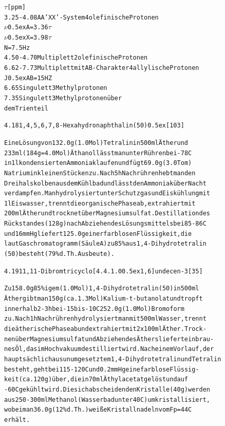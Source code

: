 \documentclass[a4paper,11pt]{article}
\begin{document}
\begin{alltt}

  \(\tau\)[ppm]
3.25 - 4.08  AA'XX'-System                4 olefinische Protonen
\(\nu\)\lower0.5ex\hbox{A} = 3.36\(\tau\)
\(\nu\)\lower0.5ex\hbox{X} = 3.98\(\tau\)
N = 7.5 Hz
4.50 - 4.70  Multiplett                   2 olefinische Protonen
6.62 - 7.73  Multiplett mit AB-Charakter  4 allylische Protonen
J\lower0.5ex\hbox{AB} = 15 HZ
6.65         Singulett                    3 Methylprotonen
7.35         Singulett                    3 Methylprotonen über
                                            dem Trienteil


\newpage
{}


4.18 1‚4,5,6‚7,8-Hexahydronaphthalin (50) \raise0.5ex\hbox{[103]}

Eine Lösung von 132.0 g (1.0 Mol) Tetralin in 500 ml Äther und
233 ml (184 g = 4.0 Mol) Äthanol lässt man unter Rühren bei -78\degree{}C
in 1 l kondensierten Ammoniak laufen und fügt 69.0 g (3.0 Tom)
Natrium in kleinen Stücken zu. Nach 5 h Nachrühren hebt man den
Dreihalskolben aus dem Kühlbad und lässt den Ammoniak über Nacht
verdampfen. Man hydrolysiert unter Schutzgas und Eiskühlung mit
1 l Eiswasser, trennt die organische Phase ab, extrahiert mit
200 ml Äther und trocknet über Magnesiumsulfat. Destillation des
Rückstandes (128 g) nach Abziehen des Lösungsmittels bei 85 - 86\degree{}C
und 16 mm Hg liefert 125.0 g einer farblosen Flüssigkeit, die
laut Gaschromatogramm (Säule A) zu 85 \% aus 1,4-Dihydrotetralin
(50) besteht (79 \% d.Th. Ausbeute).


4.19 11‚11-Dibromtricyclo[4.4.1.0\raise0.5ex\hbox{1,6}]undecen-3 [35]

Zu 158.0 g 85 \%igem (1.0 Mol) 1,4-Dihydrotetralin (50) in 500 ml
Äther gibt man 150 g (ca. 1.3 Mol) Kalium-t-butanolat und tropft
innerhalb 2 - 3 h bei -15\degree bis -10\degree{}C 252.0 g (1.0 Mol) Bromoform
zu. Nach 1 h Nachrühren hydrolysiert man mit 500 ml Wasser, trennt
die ätherische Phase ab und extrahiert mit 2 x 100 ml Äther. Trock-
nen über Magnesiumsulfat und Abziehen des Äthers liefert ein brau-
nes Öl, das im Hochvakuum destilliert wird. Nach einem Vorlauf, der
hauptsächlich aus unumgesetztem 1,4-Dihydrotetralin und Tetralin
besteht, geht bei 115 - 120\degree{}C und 0.2 mm Hg eine farblose Flüssig-
keit (ca. 120 g) über, die in 70 ml Äthylacetat gelöst und auf
-60\degree{}C gekühlt wird. Die sich abscheidenden Kristalle (40 g) werden
aus 250 - 300 ml Methanol (Wasserbad unter 40\degree{}C) umkristallisiert,
wobei man 36.0 g (12 \% d.Th.) weiße Kristallnadeln vom Fp = 44\degree{}C
erhält.



\end{alltt}
\end{document}
